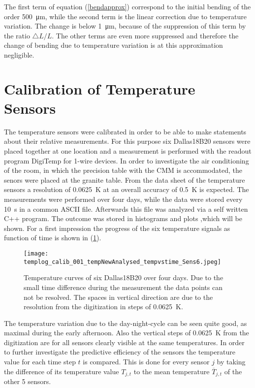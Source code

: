 \documentclass[
a4paper,                                %
twoside,                                %
BCOR1.4cm,                      %
10pt,                           %
headings=normal,                %
headsepline,                    %
clearplainpage, %
final,                                  %
div=14,
parskip=full,
openright,
bibliography=toc
]{scrreprt}
\begin{document}
The first term of equation (\ref{bendapprox}) correspond to the initial bending of the order \SI{500}{\micro\m}, while the second term is the linear correction due to temperature variation. The change is below \SI{1}{\micro\m}, because of the suppression of this term by the ratio $\bigtriangleup\!L / L$. The other terms are even more suppressed and therefore the change of bending due to temperature variation is at this approximation negligible. 

\newpage

\section{Calibration of Temperature Sensors}

The temperature sensors were calibrated in order to be able to make statements about their relative measurements. For this purpose six Dallas18B20 sensors were placed together at one location and a measurement is performed with the readout program DigiTemp for 1-wire devices. \cite{digitemp} In order to investigate the air conditioning of the room, in which the precision table with the CMM is accommodated, the senors were placed at the granite table. From the data sheet of the temperature sensors a resolution of \SI{0.0625}{K} at an overall  accuracy of \SI{0.5}{K} is expected. \cite{ds18b20} The measurements were performed over four days, while the data were stored every \SI{10}{\s} in a common ASCII file. Afterwards this file was analyzed via a self written C++ program. The outcome was stored in histograms and plots ,which will be shown. For a first impression the progress of the six temperature signals as function of time is shown in (\ref{tempvstime6sens}). 

\begin{figure}[H]
	\centering
	\texttt{[image: templog\_calib\_001\_tempNewAnalysed\_tempvstime\_Sens6.jpeg]}
	\caption{Temperature curves of six Dallas18B20 over four days. Due to the small time difference during the measurement the data points can not be resolved. The spaces in vertical direction are due to the resolution from the digitization in steps of \SI{0.0625}{K}.}
	\label{tempvstime6sens}
\end{figure}

The temperature variation due to the day-night-cycle can be seen quite good, as maximal during the early afternoon. Also the vertical steps of \SI{0.0625}{K} from the digitization are for all sensors clearly visible at the same temperatures. In order to further investigate the predictive efficiency of the sensors the temperature value for each time step $t$ is compared. This is done for every sensor $j$ by taking the difference of its temperature value $T_{j,t}$ to the mean temperature $\overline{T}_{j,t}$ of the other 5 sensors.
\end{document}
